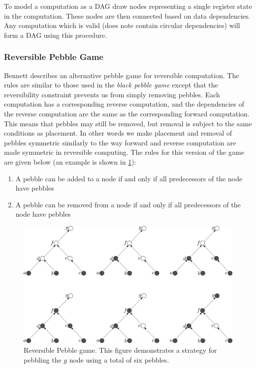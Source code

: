 To model a computation as a DAG draw nodes representing a single register state
in the computation.  These nodes are then connected based on data dependencies.
Any computation which is valid (does note contain circular dependencies) will
form a DAG using this procedure.

\subsubsection{Reversible Pebble Game}

Bennett\cite{Bennett:89} describes an alternative pebble game for reversible
computation. The rules are similar to those used in the \emph{black pebble
game} except that the reversibility constraint prevents us from simply removing
pebbles. Each computation has a corresponding reverse computation, and the
dependencies of the reverse computation are the same as the corresponding
forward computation. This means that pebbles may still be removed, but removal
is subject to the same conditions as placement. In other words we make
placement and removal of pebbles symmetric similarly to the way forward and
reverse computation are made symmetric in reversible computing.  The rules for
this version of the game are given below (an example is shown in
\cref{fig:rev-peb-game}):

\begin{enumerate}

  \item A pebble can be added to a node if and only if all predecessors of the
    node have pebbles

  \item A pebble can be removed from a node if and only if all predecessors of
    the node have pebbles

\end{enumerate}

\begin{figure}
      \capstart
      \centering
      \includegraphics[width=0.9\hsize]{images/rev-peb-game}

      \caption{Reversible Pebble game. This figure demonstrates a strategy for
      pebbling the $g$ node using a total of six pebbles.}

      \label{fig:rev-peb-game}
\end{figure}

